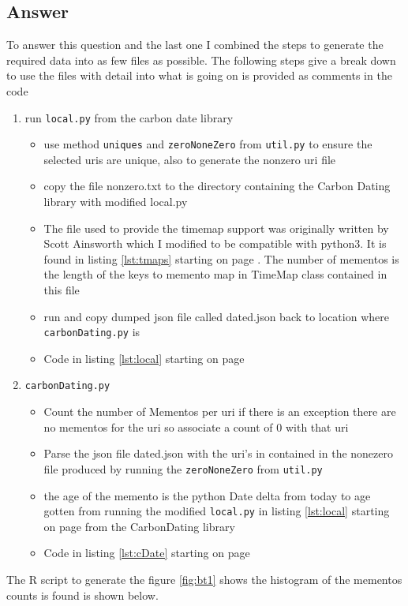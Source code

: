 \documentclass[letterpaper,10pt]{article}
\begin{document}
\subsection*{Answer}
To answer this question and the last one I combined the steps to generate the required data into as few files as possible. The following steps give a break down to use the files with detail into what is going on is provided as comments in the code 
\begin{enumerate}
\item run \verb+local.py+ from the carbon date library 
	\begin{itemize}
	\item use method \verb+uniques+ and \verb+zeroNoneZero+ from \verb+util.py+ to ensure the selected uris are unique, also to generate the nonzero uri file
	\item copy the file nonzero.txt to the directory containing the Carbon Dating library with modified local.py
	\item The file used to provide the timemap support was originally written by Scott Ainsworth which I modified to be compatible with python3. It is found in listing  \ref{lst:tmaps} starting on page \pageref{lst:tmaps}. The number of mementos is the length of the keys to memento map in TimeMap class contained in this file
	\item run and copy dumped json file called dated.json back to location where \verb+carbonDating.py+ is
	\item Code in listing \ref{lst:local} starting on page \pageref{lst:local}
	\end{itemize}
\item \verb+carbonDating.py+
	\begin{itemize}
	\item Count the number of Mementos per uri if there is an exception there are no mementos for the uri so associate a count of 0 with that uri
	\item Parse the json file dated.json with the uri's in contained in the nonezero file produced by running the \verb+zeroNoneZero+ from \verb+util.py+
	\item the age of the memento is the python Date delta from today to age gotten from running the modified \verb+local.py+ in listing \ref{lst:local} starting on page \pageref{lst:local} from the CarbonDating library 
	\item Code in listing \ref{lst:cDate} starting on page \pageref{lst:cDate}
	\end{itemize}
\end{enumerate}
The R script to generate the figure \ref{fig:bt1} shows the histogram of the mementos counts
is found is shown below.
\end{document}
